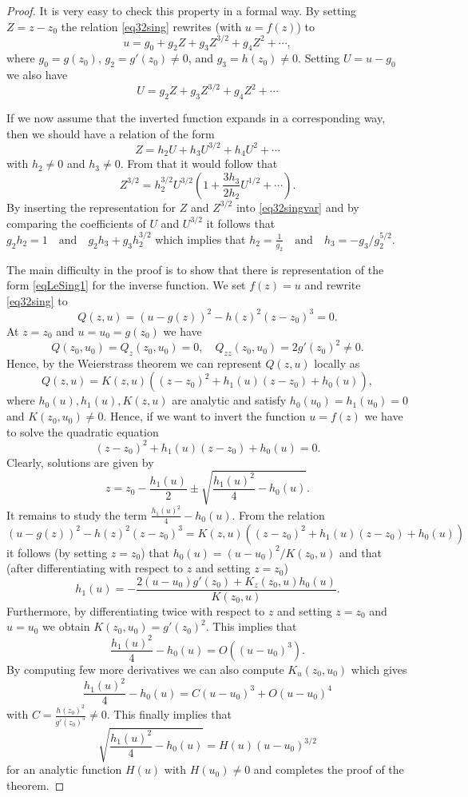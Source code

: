 \documentclass[a4paper,UKenglish,cleveref, autoref, thm-restate]{lipics-v2021}
\renewcommand{\(}{\left(}
\renewcommand{\)}{\right)}
\begin{document}
\begin{proof}
It is very easy to check this property in a formal way. By setting
$Z = z-z_0$ the relation \cref{eq32sing} rewrites (with $u = f(z)$) to
\[
u = g_0 + g_2 Z + g_3 Z^{3/2} + g_4 Z^2 + \cdots,
\]
where $g_0 = g(z_0)$, $g_2 = g'(z_0) \ne 0$, and $g_3 = h(z_0) \ne 0$.
Setting $U = u-g_0$ we also have
\begin{equation}\label{eq32singvar}
U = g_2 Z + g_3 Z^{3/2} + g_4 Z^2 + \cdots
\end{equation}

If we now assume that the inverted function expands in a corresponding
way, then we should have a relation of the form
\[
Z = h_2 U + h_3 U^{3/2} + h_4 U^2 + \cdots
\]
with $h_2\ne 0$ and $h_3\ne 0$.
From that it would follow that
\[
Z^{3/2} = h_2^{3/2} U^{3/2}\left( 1 + \frac{3h_3}{2h_2} U^{1/2} + \cdots \right).
\]
By inserting the representation for $Z$ and $Z^{3/2}$ into \cref{eq32singvar}
and by comparing the coefficients of $U$ and $U^{3/2}$ it follows that
$
g_2 h_2 = 1 \quad \mbox{and} \quad g_2 h_3 + g_3 h_2^{3/2}
$
which implies that
$
h_2 = \frac 1{g_2} \quad \mbox{and} \quad h_3 = -{g_3}/{g_2^{5/2}}.
$

The main difficulty in the proof is to show that there is representation
of the form \cref{eqLeSing1} for the inverse function.
    We set $f(z) = u$ and rewrite \cref{eq32sing} to
    \[
    Q(z,u) = (u- g(z))^2 - h(z)^2 (z-z_0)^3 = 0.
    \]
    At $z=z_0$ and $u = u_0 = g(z_0)$ we have
    \[
    Q(z_0,u_0) = Q_{z}(z_0,u_0) = 0, \quad  Q_{zz}(z_0,u_0) = 2g'(z_0)^2 \ne 0.
    \]
    Hence, by the Weierstrass theorem we can represent $Q(z,u)$ locally as
    \[
    Q(z,u) = K(z,u)( (z-z_0)^2 + h_1(u)(z-z_0) + h_0(u)),
    \]
    where $h_0(u), h_1(u), K(z,u)$ are analytic and satisfy
    $h_0(u_0) = h_1(u_0) = 0$ and $K(z_0,u_0) \ne 0$.
    Hence, if we want to invert the function $u = f(z)$
    we have to solve the quadratic equation
    \[
    (z-z_0)^2 + h_1(u)(z-z_0) + h_0(u) = 0.
    \]
    Clearly, solutions are given by
    \[
    z = z_0 - \frac{h_1(u)}2 \pm \sqrt{\frac{h_1(u)^2}4 - h_0(u)}.
    \]
    It remains to study the term $\frac{h_1(u)^2}4 - h_0(u)$. 
    From the relation
    \[
    (u- g(z))^2 - h(z)^2 (z-z_0)^3 = K(z,u)( (z-z_0)^2 + h_1(u)(z-z_0) + h_0(u))
    \]
    it follows (by setting $z=z_0$) that
    $
    h_0(u) = {(u-u_0)^2}/{K(z_0,u)}
    $
    and that (after differentiating with respect to $z$ and setting $z=z_0$)
    \[
    h_1(u) = - \frac{2(u-u_0)g'(z_0) + K_z(z_0,u)h_0(u)}{K(z_0,u)}.
    \]
    Furthermore, by differentiating twice with respect to $z$ and setting
    $z=z_0$ and $u=u_0$ we obtain
    $
    K(z_0,u_0) = g'(z_0)^2.
    $
    This implies that
    \[
    \frac{h_1(u)^2}4 - h_0(u) = O((u-u_0)^3).  
    \]
    By computing few more derivatives we can also compute $K_u(z_0,u_0)$
    which gives 
    \[
    \frac{h_1(u)^2}4 - h_0(u) = C(u-u_0)^3   + O(u-u_0)^4
    \]
    with
    $
    C = \frac{h(z_0)^2}{ g'(z_0)^5} \ne 0.
    $
    This finally implies that
    \[
    \sqrt{\frac{h_1(u)^2}4 - h_0(u)} = H(u) (u-u_0)^{3/2}
    \]
    for an analytic function $H(u)$ with $H(u_0)\ne 0$ and completes the proof of the theorem.
\end{proof}
\end{document}
